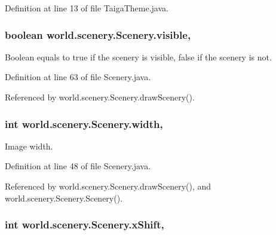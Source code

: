 Definition at line 13 of file Taiga\-Theme.\-java.

\hypertarget{classworld_1_1scenery_1_1_scenery_a7b22a78d3126c947b7010fdbbea02218}{
\subsubsection[{visible}]{\setlength{\rightskip}{0pt plus 5cm}boolean world.\-scenery.\-Scenery.\-visible\hspace{0.3cm}{\ttfamily [protected]}, {\ttfamily [inherited]}}}\label{classworld_1_1scenery_1_1_scenery_a7b22a78d3126c947b7010fdbbea02218}


Boolean equals to true if the scenery is visible, false if the scenery is not. 



Definition at line 63 of file Scenery.\-java.



Referenced by world.\-scenery.\-Scenery.\-draw\-Scenery().

\hypertarget{classworld_1_1scenery_1_1_scenery_ad10b27080954e2fc06aa1718f47c4ce1}{
\subsubsection[{width}]{\setlength{\rightskip}{0pt plus 5cm}int world.\-scenery.\-Scenery.\-width\hspace{0.3cm}{\ttfamily [protected]}, {\ttfamily [inherited]}}}\label{classworld_1_1scenery_1_1_scenery_ad10b27080954e2fc06aa1718f47c4ce1}


Image width. 



Definition at line 48 of file Scenery.\-java.



Referenced by world.\-scenery.\-Scenery.\-draw\-Scenery(), and world.\-scenery.\-Scenery.\-Scenery().

\hypertarget{classworld_1_1scenery_1_1_scenery_a0999f105f7630fd67fd9d440da6983aa}{
\subsubsection[{x\-Shift}]{\setlength{\rightskip}{0pt plus 5cm}int world.\-scenery.\-Scenery.\-x\-Shift\hspace{0.3cm}{\ttfamily [protected]}, {\ttfamily [inherited]}}}\label{classworld_1_1scenery_1_1_scenery_a0999f105f7630fd67fd9d440da6983aa}


